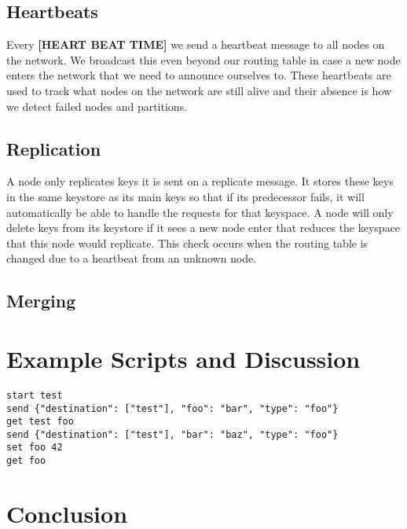 \documentclass[11pt]{article}
\begin{document}
\subsection{Heartbeats}\label{sec:HB}

Every \textbf{[HEART BEAT TIME]} we send a heartbeat message to all nodes on the network. We broadcast this even beyond our routing table in case a new node enters the network that we need to announce ourselves to. These heartbeats are used to track what nodes on the network are still alive and their absence is how we detect failed nodes and partitions.

\subsection{Replication}\label{sec:Rep}

A node only replicates keys it is sent on a replicate message. It stores these keys in the same keystore as its main keys so that if its predecessor fails, it will automatically be able to handle the requests for that keyspace. A node will only delete keys from its keystore if it sees a new node enter that reduces the keyspace that this node would replicate. This check occurs when the routing table is changed due to a heartbeat from an unknown node.

\subsection{Merging}\label{sec:Merg}



\section{Example Scripts and Discussion}\label{sec:Ex}

\begin{lstlisting}[language={}, caption={Example Script 1}, basicstyle=\ttfamily]
start test
send {"destination": ["test"], "foo": "bar", "type": "foo"}
get test foo
send {"destination": ["test"], "bar": "baz", "type": "foo"}
set foo 42
get foo
\end{lstlisting}

\section{Conclusion}\label{sec:Conc}

\clearpage

\printbibliography
\end{document}
